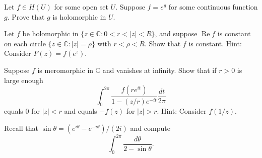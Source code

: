 \documentclass[12pt]{amsart}
\newcommand{\C}{\mathbb{C} }
\newcommand{\rea}{\operatorname{Re}}
\begin{document}
\vfill 


 Let $f\in H (U)$ for some open set $U$. Suppose
$f=e^{g}$ for some continuous function $g$. Prove that $g$ is
holomorphic in $U$.

\vfill 


 Let $f$ be holomorphic in $\{z\in\C : 0<r<|z|<R \}$,
and suppose $\rea f$ is constant on each circle $\{z\in\C :|z|=\rho
\}$ with $r<\rho <R$. Show that $f$ is constant. Hint: Consider $F
(z)=f (e^{z})$.

\vfill 


 Suppose $f$ is meromorphic in $\C$ and vanishes at
infinity. Show that if $r>0$ is large enough
\[
\int _{0}^{2\pi}\frac{f (re^{it})}{1- (z/r)e^{-it}}\frac{dt}{2\pi }
\]
equals $0$ for $|z|<r$ and equals $-f (z)$ for $|z|>r$. Hint: Consider
$f (1/z)$.

\vfill 


 Recall that $\sin \theta = (e^{i\theta
}-e^{-i\theta })/ (2i)$ and compute
\[
\int _{0}^{2\pi }\frac{d\theta }{2-\sin \theta }.
\]
\end{document}

